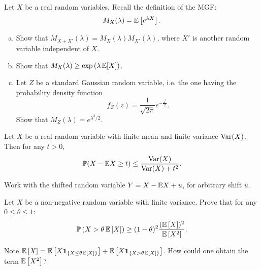 \begin{myexercise}
    \label{prob:MGF}
    Let $X$ be a real random variables. Recall the definition of the MGF:
    \begin{equation*}
        M_X(\lambda) = \mathbb{E}\left[ e^{\lambda X} \right].
    \end{equation*}
    \begin{enumerate}[(a)]
        \item Show that $M_{X+X'}(\lambda) = M_{X}(\lambda)M_{X'}(\lambda)$, where $X'$ is another random variable independent of $X$.
        
        \item Show that $M_X(\lambda) \geq \exp\left( \lambda\, \mathbb{E}[X] \right)$.

        \item Let $Z$ be a standard Gaussian random variable, i.e. the one having the probability density function
        \begin{equation*}
            f_Z(z) = \frac{1}{\sqrt{2\pi}} e^{-\frac{z^2}{2}}.
        \end{equation*}
        Show that $M_Z(\lambda) = e^{\lambda^2 / 2}$.
    \end{enumerate}
\end{myexercise}

\begin{myexercise}
    \label{prob:cantelli}
    Let $X$ be a real random variable with finite mean and finite variance $\operatorname{Var}(X)$. Then for any $t > 0$,
    \begin{equation*}
        \mathbb{P}(X - \mathbb{E} X \geq t) \leq \frac{\operatorname{Var}(X)}{\operatorname{Var}(X) + t^2}.
    \end{equation*}
\end{myexercise}
\begin{hint}
    Work with the shifted random variable $Y = X - \mathbb{E} X + u$, for arbitrary shift $u$.
\end{hint}

\begin{myexercise}
    \label{prob:paley_zygmund}
    Let $X$ be a non-negative random variable with finite variance. Prove that for any $0 \leq \theta \leq 1$:
    \begin{equation*}
        \mathbb{P}\left( X > \theta \, \mathbb{E}\left[ X \right] \right) \geq (1 - \theta)^2 \frac{(\mathbb{E}\left[ X \right])^2}{\mathbb{E}\left[ X^2 \right]}.
    \end{equation*}
\end{myexercise}
\begin{hint}
    Note $\mathbb{E}\left[ X \right] = \mathbb{E}\left[ X \mathbf{1}_{\left\{ X \leq \theta \, \mathbb{E}\left[ X \right] \right\}} \right] + \mathbb{E}\left[ X \mathbf{1}_{\left\{ X > \theta \, \mathbb{E}\left[ X \right] \right\}} \right]$. How could one obtain the term $\mathbb{E}\left[ X^2 \right]$?
\end{hint}


